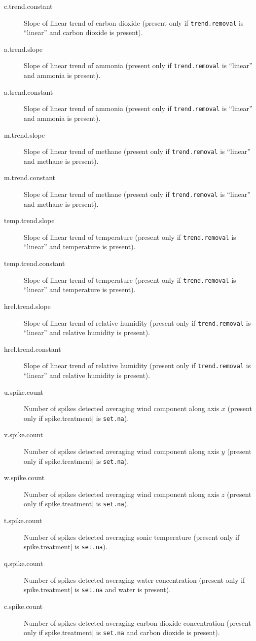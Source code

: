\documentclass[a4paper,10pt]{book}
\begin{document}
\begin{description}
 \item[c.trend.constant] Slope of linear trend of carbon dioxide (present only if \verb|trend.removal| is ``linear'' and carbon dioxide is present).
 \item[a.trend.slope] Slope of linear trend of ammonia (present only if \verb|trend.removal| is ``linear'' and ammonia is present).
 \item[a.trend.constant] Slope of linear trend of ammonia (present only if \verb|trend.removal| is ``linear'' and ammonia is present).
 \item[m.trend.slope] Slope of linear trend of methane (present only if \verb|trend.removal| is ``linear'' and methane is present).
 \item[m.trend.constant] Slope of linear trend of methane (present only if \verb|trend.removal| is ``linear'' and methane is present).
 \item[temp.trend.slope] Slope of linear trend of temperature (present only if \verb|trend.removal| is ``linear'' and temperature is present).
 \item[temp.trend.constant] Slope of linear trend of temperature (present only if \verb|trend.removal| is ``linear'' and temperature is present).
 \item[hrel.trend.slope] Slope of linear trend of relative humidity (present only if \verb|trend.removal| is ``linear'' and relative humidity is present).
 \item[hrel.trend.constant] Slope of linear trend of relative humidity (present only if \verb|trend.removal| is ``linear'' and relative humidity is present).
 \item[u.spike.count] Number of spikes detected averaging wind component along axis $x$ (present only if \verb||spike.treatment| is \verb|set.na|).
 \item[v.spike.count] Number of spikes detected averaging wind component along axis $y$ (present only if \verb||spike.treatment| is \verb|set.na|).
 \item[w.spike.count] Number of spikes detected averaging wind component along axis $z$ (present only if \verb||spike.treatment| is \verb|set.na|).
 \item[t.spike.count] Number of spikes detected averaging sonic temperature (present only if \verb||spike.treatment| is \verb|set.na|).
 \item[q.spike.count] Number of spikes detected averaging water concentration (present only if \verb||spike.treatment| is \verb|set.na| and water is present).
 \item[c.spike.count] Number of spikes detected averaging carbon dioxide concentration (present only if \verb||spike.treatment| is \verb|set.na| and carbon dioxide is present).

\end{description}
\end{document}
